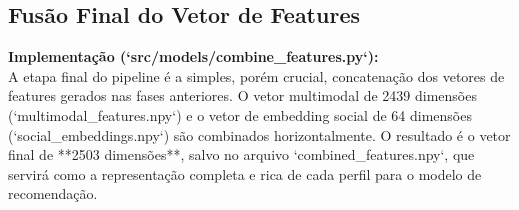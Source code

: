 \subsection{Fusão Final do Vetor de Features}
\textbf{Implementação (`src/models/combine_features.py`):} \\
A etapa final do pipeline é a simples, porém crucial, concatenação dos vetores de features gerados nas fases anteriores. O vetor multimodal de 2439 dimensões (`multimodal_features.npy`) e o vetor de embedding social de 64 dimensões (`social_embeddings.npy`) são combinados horizontalmente. O resultado é o vetor final de **2503 dimensões**, salvo no arquivo `combined_features.npy`, que servirá como a representação completa e rica de cada perfil para o modelo de recomendação.